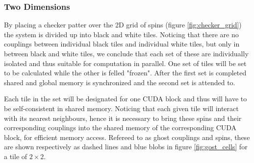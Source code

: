 \documentclass[paper=a4, fontsize=11pt]{scrartcl} %
\numberwithin{equation}{section} %
\numberwithin{figure}{section} %
\numberwithin{table}{section} %
\begin{document}
\subsubsection{Two Dimensions}
By placing a checker patter over the 2D grid of spins (figure \ref{fig:checker_grid}) the system is divided up into black and white tiles. Noticing that there are no couplings between individual black tiles and individual white tiles, but only in between black and white tiles, we conclude that each set of these are individually isolated and thus suitable for computation in parallel. One set of tiles will be set to be calculated while the other is felled "frozen". After the first set is completed shared and global memory is synchronized and the second set is attended to.

Each tile in the set will be designated for one CUDA block and thus will have to be self-consistent in shared memory. Noticing that each given tile will interact with its nearest neighbours, hence it is necessary to bring these spins and their corresponding couplings into the shared memory of the corresponding CUDA block, for efficient memory access. Refereed to as ghost couplings and spins, these are shown respectively as dashed lines and blue blobs in figure \ref{fig:gost_cells} for a tile of $2\times2$.
\end{document}
